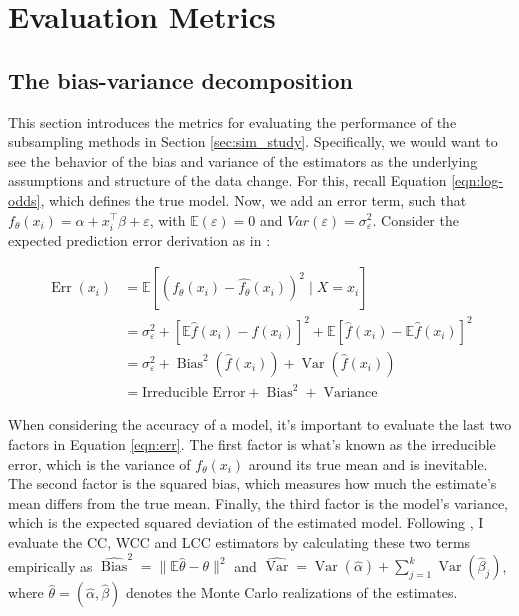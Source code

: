 \section{Evaluation Metrics}
\label{sec:metrics}

\subsection{The bias-variance decomposition}

This section introduces the metrics for evaluating the performance of the subsampling methods in Section \ref{sec:sim_study}. Specifically, we would want to see the behavior of the bias and variance of the estimators as the underlying assumptions and structure of the data change. For this, recall Equation \ref{eqn:log-odds}, which defines the true model. Now, we add an error term, such that  $f_\theta (x_i) = \alpha + x_i^\intercal \beta + \varepsilon$, with $\mathbb{E}(\varepsilon) = 0$ and $Var(\varepsilon) = \sigma_{\varepsilon}^2$. Consider the expected prediction error derivation as in \textcite{hastie2009elements}:

\begin{equation}
    \begin{aligned}
    \operatorname{Err}\left(x_i\right) & =\mathbb{E}\left[\left(f_\theta (x_i)-\hat{f_\theta}\left(x_i\right)\right)^2 \mid X = x_i \right] \\
    & =\sigma_{\varepsilon}^2+\left[\mathbb{E} \hat{f}\left(x_i\right)-f\left(x_i\right)\right]^2+\mathbb{E}\left[\hat{f}\left(x_i\right)-\mathbb{E} \hat{f}\left(x_i\right)\right]^2 \\
    & =\sigma_{\varepsilon}^2+\operatorname{Bias}^2\left(\hat{f}\left(x_i\right)\right)+\operatorname{Var}\left(\hat{f}\left(x_i\right)\right) \\
    & =\text{Irreducible Error}+\operatorname{Bias}^2+\operatorname{Variance}
    \label{eqn:err}
    \end{aligned}
\end{equation}


When considering the accuracy of a model, it's important to evaluate the last two factors in Equation \ref{eqn:err}. The first factor is what's known as the irreducible error, which is the variance of $f_\theta (x_i)$ around its true mean and is inevitable. The second factor is the squared bias, which measures how much the estimate's mean differs from the true mean. Finally, the third factor is the model's variance, which is the expected squared deviation of the estimated model. Following \textcite{hastie2014}, I evaluate the CC, WCC and LCC estimators by calculating these two terms empirically as $\widehat{\operatorname{Bias}}^2 = \|\mathbb{E}\hat{\theta} - \theta\|^2$ and $\widehat{\operatorname{Var}} = \operatorname{Var}(\hat{\alpha}) + \sum_{j=1}^k \operatorname{Var}(\hat{\beta}_j)$, where $\hat{\theta} = (\hat{\alpha}, \hat{\beta})$ denotes the Monte Carlo realizations of the estimates.


